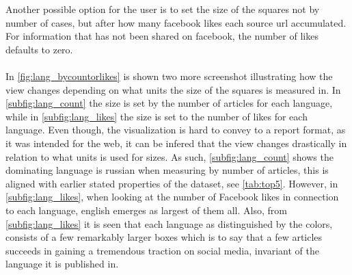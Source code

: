 \documentclass{article}
\begin{document}
Another possible option for the user is to set the size of the squares not by number of cases, but after how many facebook likes each source url accumulated. For information that has not been shared on facebook, the number of likes defaults to zero. 
\\\\
In \cref{fig:lang_bycountorlikes} is shown two more screenshot illustrating how the view changes depending on what units the size of the squares is measured in. In \cref{subfig:lang_count} the size is set by the number of articles for each language, while in \cref{subfig:lang_likes} the size is set to the number of likes for each language. Even though, the visualization is hard to convey to a report format, as it was intended for the web, it can be infered that the view changes drastically in relation to what units is used for sizes. As such, \cref{subfig:lang_count} shows the dominating language is russian when measuring by number of articles, this is aligned with earlier stated properties of the dataset, see \cref{tab:top5}. However, in \cref{subfig:lang_likes}, when looking at the number of Facebook likes in connection to each language, english emerges as largest of them all. Also, from \cref{subfig:lang_likes} it is seen that each language as distinguished by the colors, consists of a few remarkably larger boxes which is to say that a few articles succeeds in gaining a tremendous traction on social media, invariant of the language it is published in.   
\end{document}

